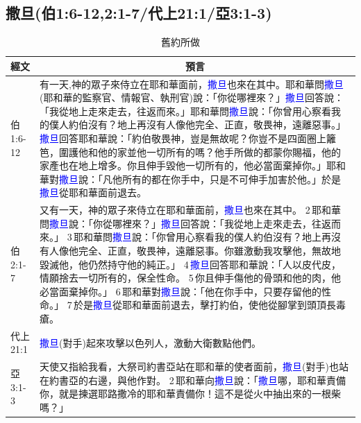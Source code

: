 \subsection{撒旦(伯1:6-12,2:1-7/代上21:1/亞3:1-3)}
\begin{table}[H]
\centering
\begin{tabular}{p{1.5cm}|p{}}\hline\hline
  \multicolumn{1}{c|}{經文}&\multicolumn{1}{c}{預言}\\\hline
伯1:6-12&有一天,神的眾子來侍立在耶和華面前，\textcolor{blue}{撒旦}也來在其中。耶和華問\textcolor{blue}{撒旦}(耶和華的監察官、情報官、執刑官)說：「你從哪裡來？」\textcolor{blue}{撒旦}回答說：「我從地上走來走去，往返而來。」耶和華問\textcolor{blue}{撒旦}說：「你曾用心察看我的僕人約伯沒有？地上再沒有人像他完全、正直，敬畏神，遠離惡事。」\textcolor{blue}{撒旦}回答耶和華說：「約伯敬畏神，豈是無故呢？你豈不是四面圈上籬笆，圍護他和他的家並他一切所有的嗎？他手所做的都蒙你賜福，他的家產也在地上增多。你且伸手毀他一切所有的，他必當面棄掉你。」耶和華對\textcolor{blue}{撒旦}說：「凡他所有的都在你手中，只是不可伸手加害於他。」於是\textcolor{blue}{撒旦}從耶和華面前退去。\\\hline

伯2:1-7&又有一天，神的眾子來侍立在耶和華面前，\textcolor{blue}{撒旦}也來在其中。 2 耶和華問\textcolor{blue}{撒旦}說：「你從哪裡來？」\textcolor{blue}{撒旦}回答說：「我從地上走來走去，往返而來。」 3 耶和華問\textcolor{blue}{撒旦}說：「你曾用心察看我的僕人約伯沒有？地上再沒有人像他完全、正直，敬畏神，遠離惡事。你雖激動我攻擊他，無故地毀滅他，他仍然持守他的純正。」 4 \textcolor{blue}{撒旦}回答耶和華說：「人以皮代皮，情願捨去一切所有的，保全性命。 5 你且伸手傷他的骨頭和他的肉，他必當面棄掉你。」 6 耶和華對\textcolor{blue}{撒旦}說：「他在你手中，只要存留他的性命。」 7 於是\textcolor{blue}{撒旦}從耶和華面前退去，擊打約伯，使他從腳掌到頭頂長毒瘡。\\\hline

代上21:1&\textcolor{blue}{撒旦}(對手)起來攻擊以色列人，激動大衛數點他們。\\\hline

亞3:1-3&天使又指給我看，大祭司約書亞站在耶和華的使者面前，\textcolor{blue}{撒旦}(對手)也站在約書亞的右邊，與他作對。 2 耶和華向\textcolor{blue}{撒旦}說：「\textcolor{blue}{撒旦}哪，耶和華責備你，就是揀選耶路撒冷的耶和華責備你！這不是從火中抽出來的一根柴嗎？」\\\hline

\end{tabular}
\caption{舊約所做}
\end{table}


